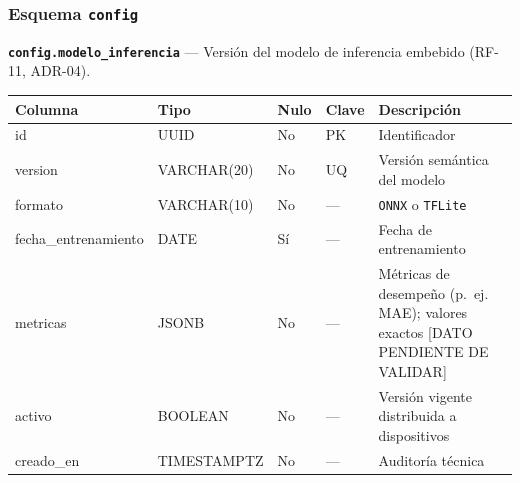 \documentclass[11pt,a4paper]{article}
\begin{document}
\subsubsection{\texorpdfstring{Esquema \texttt{config}}{Esquema config}}\label{esquema-config}

\textbf{\texttt{config.modelo\_inferencia}} --- Versión del modelo de inferencia embebido (RF-11, ADR-04).

{\small
\begin{longtable}[]{@{}
  >{\raggedright\arraybackslash}p{}
  >{\raggedright\arraybackslash}p{}
  >{\raggedright\arraybackslash}p{}
  >{\raggedright\arraybackslash}p{}
  >{\raggedright\arraybackslash}p{}@{}}
\toprule\noalign{}
\begin{minipage}[b]{\linewidth}\raggedright
Columna
\end{minipage} & \begin{minipage}[b]{\linewidth}\raggedright
Tipo
\end{minipage} & \begin{minipage}[b]{\linewidth}\raggedright
Nulo
\end{minipage} & \begin{minipage}[b]{\linewidth}\raggedright
Clave
\end{minipage} & \begin{minipage}[b]{\linewidth}\raggedright
Descripción
\end{minipage} \\
\midrule\noalign{}
\endhead
\bottomrule\noalign{}
\endlastfoot
id & UUID & No & PK & Identificador \\
version & VARCHAR(20) & No & UQ & Versión semántica del modelo \\
formato & VARCHAR(10) & No & --- & \texttt{ONNX} o \texttt{TFLite} \\
fecha\_entrenamiento & DATE & Sí & --- & Fecha de entrenamiento \\
metricas & JSONB & No & --- & Métricas de desempeño (p.~ej. MAE); valores exactos {[}DATO PENDIENTE DE VALIDAR{]} \\
activo & BOOLEAN & No & --- & Versión vigente distribuida a dispositivos \\
creado\_en & TIMESTAMPTZ & No & --- & Auditoría técnica \\
\end{longtable}
}
\end{document}
